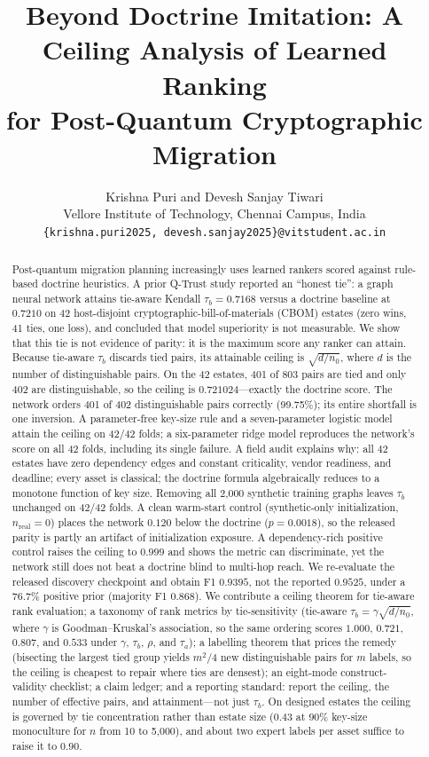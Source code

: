 \documentclass[conference,10pt]{IEEEtran}
\title{Beyond Doctrine Imitation: A Ceiling Analysis of Learned Ranking\\
for Post-Quantum Cryptographic Migration}
\author{Krishna Puri and Devesh Sanjay Tiwari\\
Vellore Institute of Technology, Chennai Campus, India\\
\texttt{\{krishna.puri2025, devesh.sanjay2025\}@vitstudent.ac.in}}
\newcommand{\tb}{\tau_b}
\newcommand{\distinct}{d}
\newcommand{\nzero}{n_0}
\begin{document}
\maketitle

\begin{abstract}
Post-quantum migration planning increasingly uses learned rankers scored against rule-based
doctrine heuristics. A prior Q-Trust study reported an ``honest tie'': a graph neural network
attains tie-aware Kendall $\tb=0.7168$ versus a doctrine baseline at $0.7210$ on 42
host-disjoint cryptographic-bill-of-materials (CBOM) estates (zero wins, 41 ties, one loss),
and concluded that model superiority is not measurable. We show that this tie is not evidence
of parity: it is the maximum score any ranker can attain. Because tie-aware $\tb$ discards
tied pairs, its attainable ceiling is $\sqrt{\distinct/\nzero}$, where $\distinct$ is the
number of distinguishable pairs. On the 42 estates, 401 of 803 pairs are tied and only 402 are
distinguishable, so the ceiling is $0.721024$---exactly the doctrine score. The network orders
401 of 402 distinguishable pairs correctly (99.75\%); its entire shortfall is one inversion. A
parameter-free key-size rule and a seven-parameter logistic model attain the ceiling on 42/42
folds; a six-parameter ridge model reproduces the network's score on all 42 folds, including
its single failure. A field audit explains why: all 42 estates have zero dependency edges and
constant criticality, vendor readiness, and deadline; every asset is classical; the doctrine
formula algebraically reduces to a monotone function of key size. Removing all 2,000 synthetic
training graphs leaves $\tb$ unchanged on 42/42 folds. A clean warm-start control
(synthetic-only initialization, $n_{\text{real}}=0$) places the network $0.120$ below the
doctrine ($p=0.0018$), so the released parity is partly an artifact of initialization
exposure. A dependency-rich positive control raises the ceiling to $0.999$ and shows the metric
can discriminate, yet the network still does not beat a doctrine blind to multi-hop reach. We
re-evaluate the released discovery checkpoint and obtain F1 $0.9395$, not the reported
$0.9525$, under a $76.7\%$ positive prior (majority F1 $0.868$). We contribute a ceiling
theorem for tie-aware rank evaluation; a taxonomy of rank metrics by tie-sensitivity
(tie-aware $\tb=\gamma\sqrt{\distinct/\nzero}$, where $\gamma$ is Goodman--Kruskal's
association, so the same ordering scores $1.000$, $0.721$, $0.807$, and $0.533$ under $\gamma$,
$\tb$, $\rho$, and $\tau_a$); a labelling theorem that prices the remedy (bisecting the largest
tied group yields $m^2/4$ new distinguishable pairs for $m$ labels, so the ceiling is cheapest to
repair where ties are densest); an eight-mode construct-validity checklist; a claim ledger; and a
reporting standard: report the ceiling, the number of effective pairs, and attainment---not just
$\tb$. On designed estates the ceiling is governed by tie concentration rather than estate size
($0.43$ at $90\%$ key-size monoculture for $n$ from 10 to 5{,}000), and about two expert labels
per asset suffice to raise it to $0.90$.
\end{abstract}
\end{document}
